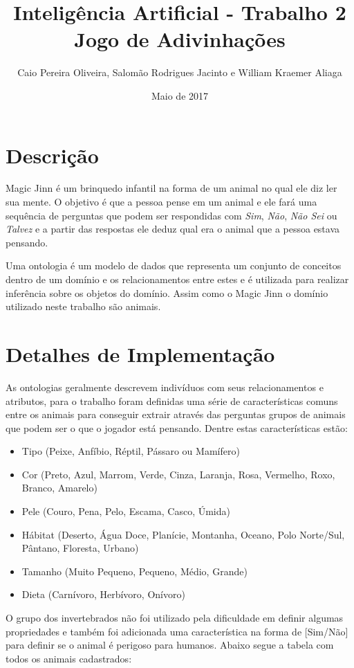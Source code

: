 \documentclass{article}
\title{Inteligência Artificial - Trabalho 2\\Jogo de Adivinhações}
\author{Caio Pereira Oliveira, Salomão Rodrigues Jacinto e William Kraemer Aliaga}
\date{Maio de 2017}
\begin{document}
\maketitle

\section{Descrição}

Magic Jinn é um brinquedo infantil na forma de um animal no qual ele diz ler sua mente. O objetivo é que a pessoa pense em um animal e ele fará uma sequência de perguntas que podem ser respondidas com  \textit{Sim}, \textit{Não}, \textit{Não Sei} ou \textit{Talvez} e a partir das respostas ele deduz qual era o animal que a pessoa estava pensando.

Uma ontologia é um modelo de dados que representa um conjunto de conceitos dentro de um domínio e os relacionamentos entre estes e é utilizada para realizar inferência sobre os objetos do domínio. Assim como o Magic Jinn o domínio utilizado neste trabalho são animais.


\section{Detalhes de Implementação}

As ontologias geralmente descrevem indivíduos com seus relacionamentos e atributos, para o trabalho foram definidas uma série de características comuns entre os animais para conseguir extrair através das perguntas grupos de animais que podem ser o que o jogador está pensando. Dentre estas características estão:

\begin{itemize}
    \item Tipo (Peixe, Anfíbio, Réptil, Pássaro ou  Mamífero)
    \item Cor (Preto, Azul, Marrom, Verde, Cinza, Laranja, Rosa, Vermelho, Roxo, Branco, Amarelo)
    \item Pele (Couro, Pena, Pelo, Escama, Casco, Úmida)
    \item Hábitat (Deserto, Água Doce, Planície, Montanha, Oceano, Polo Norte/Sul, Pântano, Floresta, Urbano)
    \item Tamanho (Muito Pequeno, Pequeno, Médio, Grande)
    \item Dieta (Carnívoro, Herbívoro, Onívoro)
\end{itemize}

O grupo dos invertebrados não foi utilizado pela dificuldade em definir algumas propriedades e também foi adicionada uma característica na forma de [Sim/Não] para definir se o animal é perigoso para humanos. Abaixo segue a tabela com todos os animais cadastrados:
\end{document}
